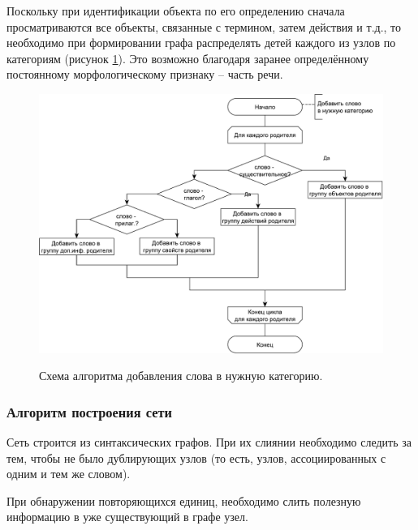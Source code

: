 Поскольку при идентификации объекта по его определению сначала просматриваются все объекты, связанные с термином, затем действия и т.д., то необходимо при формировании графа распределять детей каждого из узлов по категориям (рисунок \ref{fig32:image}). Это возможно благодаря заранее определённому постоянному морфологическому признаку -- часть речи.
\begin{figure}[h]
	\begin{center}
		{\includegraphics[scale = 0.58]{img/schemes/pdf/add_category.pdf}}
		\caption{Схема алгоритма добавления слова в нужную категорию.}
		\label{fig32:image}
	\end{center}
\end{figure}

\subsubsection{Алгоритм построения сети}
Сеть строится из синтаксических графов. При их слиянии необходимо следить за тем, чтобы не было дублирующих узлов (то есть, узлов, ассоциированных с одним и тем же словом). 

При обнаружении повторяющихся единиц, необходимо слить полезную информацию в уже существующий в графе узел.

